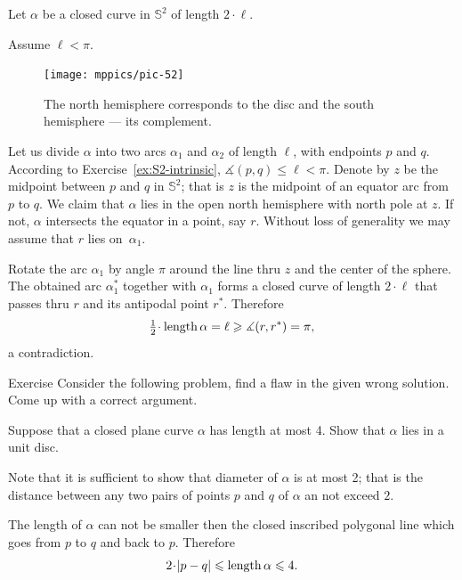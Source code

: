 Let $\alpha$ be a closed curve in $\mathbb{S}^2$ of length $2\cdot\ell$.


Assume $\ell<\pi$.

\begin{figure}
\vskip-0mm
\centering
\texttt{[image: mppics/pic-52]}
\caption*{The north hemisphere corresponds to the disc and the south hemisphere --- its complement.}
\end{figure}

Let us divide $\alpha$ into two arcs $\alpha_1$ and $\alpha_2$ of length $\ell$, with endpoints $p$ and $q$. 
According to Exercise~\ref{ex:S2-intrinsic}, $\measuredangle(p,q)\le\ell<\pi$.
Denote by $z$ be the midpoint between $p$ and $q$ in $\mathbb{S}^2$;
that is $z$ is the midpoint of an equator arc from $p$ to $q$. 
We claim that $\alpha$ lies in the open north hemisphere with north pole at $z$.  
If not, $\alpha$ intersects the equator in a point, say $r$.
Without loss of generality we may assume that $r$ lies on~$\alpha_1$. 

Rotate the arc $\alpha_1$ by angle $\pi$ around the line thru $z$ and the center of the sphere.
The obtained arc $\alpha_1^{*}$ together with $\alpha_1$ forms a closed curve of length $2\cdot \ell$ that passes thru $r$ and its antipodal point $r^{*}$.
Therefore
\[\tfrac12\cdot\length \alpha=\ell\ge \measuredangle(r,r^{*})=\pi,\] 
a contradiction.
\qeds

\begin{thm}{Exercise}\label{ex:flaw}
Consider the following problem, find a flaw in the given wrong solution.
Come up with a correct argument.
\end{thm}

 
Suppose that a closed plane curve $\alpha$ has length at most 4.
Show that $\alpha$ lies in a unit disc.

Note that it is sufficient to show that diameter of $\alpha$ is at most 2;
that is the distance between any two pairs of points $p$ and $q$ of $\alpha$ an not exceed $2$.

The length of $\alpha$ can not be smaller then the closed inscribed polygonal line which goes from $p$ to $q$ and back to $p$.
Therefore 
\[2\cdot |p-q|\le\length \alpha\le 4.\]
\qedsf

